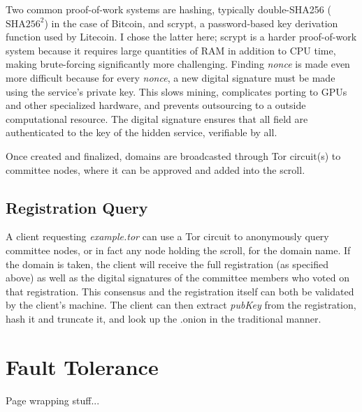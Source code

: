 Two common proof-of-work systems are hashing, typically double-SHA256 ($ \textrm{SHA}256^{{2}} $) in the case of Bitcoin, and scrypt, a password-based key derivation function used by Litecoin. I chose the latter here; scrypt is a harder proof-of-work system because it requires large quantities of RAM in addition to CPU time, making brute-forcing significantly more challenging. Finding \textit{nonce} is made even more difficult because for every \textit{nonce}, a new digital signature must be made using the service's private key. This slows mining, complicates porting to GPUs and other specialized hardware, and prevents outsourcing to a outside computational resource. The digital signature ensures that all field are authenticated to the key of the hidden service, verifiable by all.

Once created and finalized, domains are broadcasted through Tor circuit(s) to committee nodes, where it can be approved and added into the scroll.

\subsection{Registration Query}

A client requesting \textit{example.tor} can use a Tor circuit to anonymously query committee nodes, or in fact any node holding the scroll, for the domain name. If the domain is taken, the client will receive the full registration (as specified above) as well as the digital signatures of the committee members who voted on that registration. This consensus and the registration itself can both be validated by the client's machine. The client can then extract \textit{pubKey} from the registration, hash it and truncate it, and look up the .onion in the traditional manner.




\section{Fault Tolerance}

Page wrapping stuff...